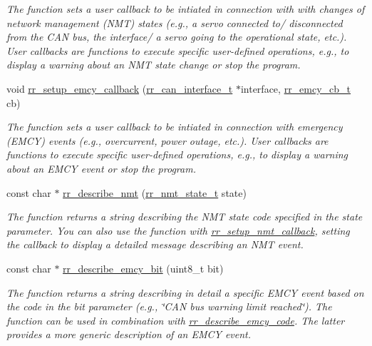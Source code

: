 \begin{DoxyCompactItemize}
\begin{DoxyCompactList}\small\item\em The function sets a user callback to be intiated in connection with with changes of network management (N\+MT) states (e.\+g., a servo connected to/ disconnected from the C\+AN bus, the interface/ a servo going to the operational state, etc.). User callbacks are functions to execute specific user-\/defined operations, e.\+g., to display a warning about an N\+MT state change or stop the program. \end{DoxyCompactList}\item 
void \hyperlink{group___utils_ga40acd9287486a662f2b17b89c4f08aed}{rr\+\_\+setup\+\_\+emcy\+\_\+callback} (\hyperlink{structrr__can__interface__t}{rr\+\_\+can\+\_\+interface\+\_\+t} $\ast$interface, \hyperlink{api_8h_a3850d8aa5bc177cb66b7638cafd30204}{rr\+\_\+emcy\+\_\+cb\+\_\+t} cb)
\begin{DoxyCompactList}\small\item\em The function sets a user callback to be intiated in connection with emergency (E\+M\+CY) events (e.\+g., overcurrent, power outage, etc.). User callbacks are functions to execute specific user-\/defined operations, e.\+g., to display a warning about an E\+M\+CY event or stop the program. \end{DoxyCompactList}\item 
const char $\ast$ \hyperlink{group___utils_ga91beec8d2ca8ea03583c21a285297861}{rr\+\_\+describe\+\_\+nmt} (\hyperlink{api_8h_afaf255d20b35be64a488b42e11feab29}{rr\+\_\+nmt\+\_\+state\+\_\+t} state)
\begin{DoxyCompactList}\small\item\em The function returns a string describing the N\+MT state code specified in the \textquotesingle{}state\textquotesingle{} parameter. You can also use the function with \hyperlink{group___utils_ga2433f49950ad40f06537287b52852c13}{rr\+\_\+setup\+\_\+nmt\+\_\+callback}, setting the callback to display a detailed message describing an N\+MT event. \end{DoxyCompactList}\item 
const char $\ast$ \hyperlink{group___utils_gaa949cec80a64afa06ed9816fe1132888}{rr\+\_\+describe\+\_\+emcy\+\_\+bit} (uint8\+\_\+t bit)
\begin{DoxyCompactList}\small\item\em The function returns a string describing in detail a specific E\+M\+CY event based on the code in the \textquotesingle{}bit\textquotesingle{} parameter (e.\+g., \char`\"{}\+C\+A\+N bus warning limit reached\char`\"{}). The function can be used in combination with \hyperlink{group___utils_ga2a5b7ff5f0e37ae3a856757cff7ced4f}{rr\+\_\+describe\+\_\+emcy\+\_\+code}. The latter provides a more generic description of an E\+M\+CY event. \end{DoxyCompactList}\item 

\end{DoxyCompactItemize}
